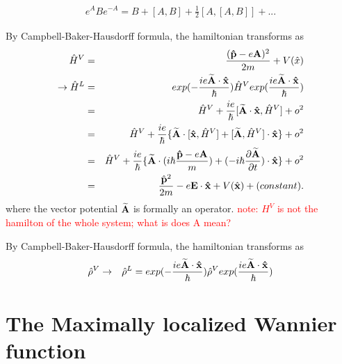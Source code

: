 \documentclass[aps,prb,preprint]{revtex4-1}
\begin{document}
\begin{appendix}
\begin{eqnarray}
e^A B e^{-A} = B+ [A,B] +\frac{1}{2}[A,[A,B]] + ... \nonumber  
\end{eqnarray} 

By Campbell-Baker-Hausdorff formula, the hamiltonian transforms as  
\begin{eqnarray}
\hat{H}^V &=& \frac{ ({\bf \hat{p}} - e{\bf A})^2 }{2m} + V(\hat{x}) \nonumber \nonumber \\ 
\rightarrow \hat{H}^L &=& exp(-\frac{ i e {\bf \widetilde{A} \cdot \hat{x}} }{\hbar}) \hat{H}^V exp( \frac{ i e {\bf \widetilde{A} \cdot \hat{x}}}{\hbar}) \nonumber \\
&=& \hat{H}^V + \frac{i e}{\hbar}[{\bf \widetilde{A} \cdot \hat{x} }, \hat{H}^V] + o^2 \nonumber \\
&=& \hat{H}^V + \frac{i e}{\hbar} \{ {\bf \widetilde{A}} \cdot [ {\bf \hat{x} }, \hat{H}^V] + [ {\bf \widetilde{A}} , \hat{H}^V] \cdot {\bf \hat{x} } \}+ o^2 \nonumber \\
&=& \hat{H}^V + \frac{i e}{\hbar} \{ {\bf \widetilde{A}} \cdot (i \hbar \frac{{\bf \hat{p}} - e{\bf A}}{m}) + (- i \hbar \frac{\partial \widetilde{\bf A}}{\partial t}) \cdot {\bf \hat{x} } \}+ o^2 \nonumber \\
&=& \frac{ \hat{\bf p}^2 }{2m} -e {\bf E \cdot \hat{\bf x}} + V(\hat{\bf x})+ (constant).\nonumber \\
\end{eqnarray} 
where the vector potential ${\bf \widetilde{A}}$ is formally an operator. 
\textcolor{red}{note: $H^V$ is not the hamilton of the whole system; what is does A mean?}

By Campbell-Baker-Hausdorff formula, the hamiltonian transforms as  
\begin{eqnarray}
\hat{\rho}^V &\rightarrow& \hat{\rho}^L =exp(-\frac{ i e {\bf \widetilde{A} \cdot \hat{x}} }{\hbar}) \hat{\rho}^V exp( \frac{ i e {\bf \widetilde{A} \cdot \hat{x}}}{\hbar}) \nonumber \\\end{eqnarray} 

\section{The Maximally localized Wannier function}
\end{appendix}




\end{document}
